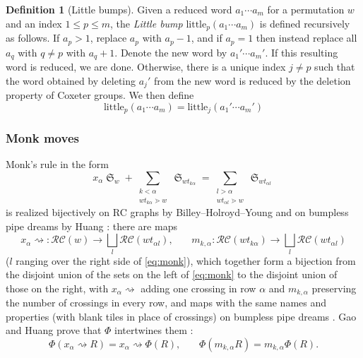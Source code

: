 \documentclass{amsart}
\theoremstyle{definition}
\newtheorem{definition}[lemma]{Definition}
\theoremstyle{remark}
\numberwithin{equation}{subsection}
\DeclareMathOperator{\sch}{\mathfrak{S}}
\newcommand{\RC}{\mathcal{RC}}
\newcommand{\ltb}{\mathrm{little}}
\begin{document}
\begin{definition}[Little bumps]\label{definition:littlebump}
  Given a reduced word $a_1\cdots a_m$ for a permutation $w$ and an index $1\leq p\leq m$, the \emph{Little bump} $\ltb_p(a_1\cdots a_m)$ is defined recursively as follows. If $a_p>1$, replace $a_p$ with $a_p-1$, and if $a_p=1$ then instead replace all $a_q$ with $q\neq p$ with $a_q+1$. Denote the new word by $a_1'\cdots a_m'$. If this resulting word is reduced, we are done. Otherwise, there is a unique index $j\neq p$ such that the word obtained by deleting $a_j'$ from the new word is reduced by the deletion property of Coxeter groups. We then define
  $$\ltb_p(a_1\cdots a_m) = \ltb_j(a_1'\cdots a_m')$$
\end{definition}

\subsubsection*{Monk moves}
Monk's rule in the form
\begin{equation}\label{eq:monk}
x_\alpha\sch_w+\sum_{\substack{k<\alpha\\ wt_{k\alpha}\gtrdot w}}\sch_{wt_{k\alpha}}=\sum_{\substack{l>\alpha\\ wt_{\alpha l}\gtrdot w}}\sch_{wt_{\alpha l}}
\end{equation}
is realized bijectively on RC graphs by Billey--Holroyd--Young \cite{billey2019bijective} and on bumpless pipe dreams by Huang \cite{huang2020monk}: there are maps
$$x_\alpha\!\rightsquigarrow:\RC(w)\to\bigsqcup_{l}\RC(wt_{\alpha l})\text{,}\qquad m_{k,\alpha}:\RC(wt_{k\alpha})\to\bigsqcup_{l}\RC(wt_{\alpha l})$$
($l$ ranging over the right side of \eqref{eq:monk}), which together form a bijection from the disjoint union of the sets on the left of \eqref{eq:monk} to the disjoint union of those on the right, with $x_\alpha\!\rightsquigarrow$ adding one crossing in row $\alpha$ and $m_{k,\alpha}$ preserving the number of crossings in every row, and maps with the same names and properties (with blank tiles in place of crossings) on bumpless pipe dreams \cite[Definitions~4.2 and~4.4]{GaoHuang2023}. Gao and Huang prove that $\Phi$ intertwines them \cite[Theorem~4.5]{GaoHuang2023}:
\begin{equation}\label{eq:GHintertwine}
\Phi(x_\alpha\!\rightsquigarrow R)=x_\alpha\!\rightsquigarrow\Phi(R)\text{,}\qquad \Phi(m_{k,\alpha}R)=m_{k,\alpha}\Phi(R)\text{.}
\end{equation}
\end{document}
